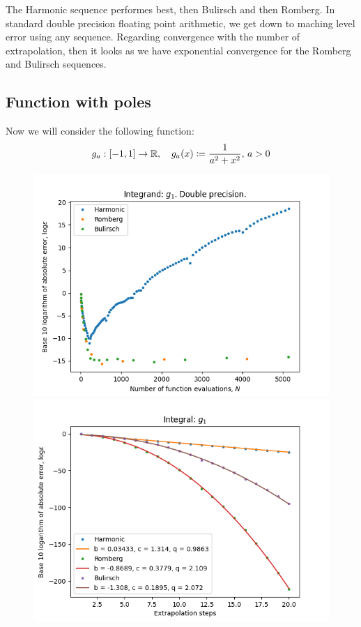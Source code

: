 The Harmonic sequence performes best, then Bulirsch and then Romberg. In standard double precision floating point arithmetic, we get down to maching level error using any sequence. Regarding convergence with the number of extrapolation, then it looks as we have exponential convergence for the Romberg and Bulirsch sequences.

\subsection{Function with poles}

Now we will consider the following function:
\[
g_a: [-1, 1] \rightarrow \mathbb{R}, \quad g_a(x) \coloneqq \frac{1}{a^2 + x^2},\, a > 0
\]
\begin{figure}[H]
\centering
\begin{minipage}{0.45\textwidth}
\centering
\includegraphics[scale=0.45]{romberg_plots/g_one.png}
\end{minipage}
\begin{minipage}{0.45\textwidth}
\centering
\includegraphics[scale=0.45]{romberg_plots/g_one_hp_steps.png}
\end{minipage}
\end{figure}

